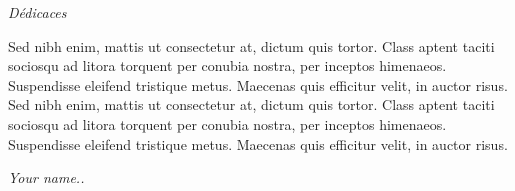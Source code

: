 \begin{center}
\Huge{\emph{Dédicaces}}
\end{center}
\vspace{1cm}
\begin{center}
Sed nibh enim, mattis ut consectetur at, dictum quis tortor. Class aptent taciti sociosqu ad litora torquent per conubia nostra, per inceptos himenaeos. Suspendisse eleifend tristique metus. Maecenas quis efficitur velit, in auctor risus. 
Sed nibh enim, mattis ut consectetur at, dictum quis tortor. Class aptent taciti sociosqu ad litora torquent per conubia nostra, per inceptos himenaeos. Suspendisse eleifend tristique metus. Maecenas quis efficitur velit, in auctor risus. 
\end{center} 
\vspace{2cm}
\begin{flushright}
	\textit{Your name..}
\end{flushright}



